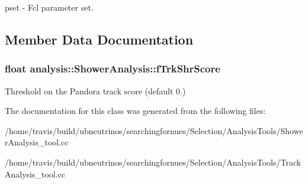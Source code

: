 pset -\/ Fcl parameter set. 

\subsection{Member Data Documentation}
\hypertarget{classanalysis_1_1ShowerAnalysis_a6c8d14b6e2fa51eeda76204dbd27ca3d}{
\subsubsection[{f\-Trk\-Shr\-Score}]{\setlength{\rightskip}{0pt plus 5cm}float analysis\-::\-Shower\-Analysis\-::f\-Trk\-Shr\-Score\hspace{0.3cm}{\ttfamily [private]}}}\label{classanalysis_1_1ShowerAnalysis_a6c8d14b6e2fa51eeda76204dbd27ca3d}
Threshold on the Pandora track score (default 0.) 

The documentation for this class was generated from the following files\-:\begin{DoxyCompactItemize}
\item 
/home/travis/build/ubneutrinos/searchingfornues/\-Selection/\-Analysis\-Tools/Shower\-Analysis\-\_\-tool.\-cc\item 
/home/travis/build/ubneutrinos/searchingfornues/\-Selection/\-Analysis\-Tools/Track\-Analysis\-\_\-tool.\-cc\end{DoxyCompactItemize}
